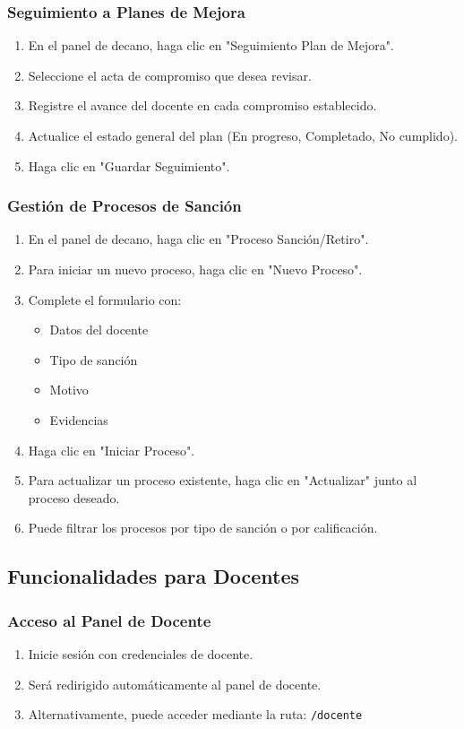 \documentclass[12pt,a4paper]{article}
\begin{document}
\subsubsection{Seguimiento a Planes de Mejora}
\begin{enumerate}
    \item En el panel de decano, haga clic en "Seguimiento Plan de Mejora".
    \item Seleccione el acta de compromiso que desea revisar.
    \item Registre el avance del docente en cada compromiso establecido.
    \item Actualice el estado general del plan (En progreso, Completado, No cumplido).
    \item Haga clic en "Guardar Seguimiento".
\end{enumerate}

\subsubsection{Gestión de Procesos de Sanción}
\begin{enumerate}
    \item En el panel de decano, haga clic en "Proceso Sanción/Retiro".
    \item Para iniciar un nuevo proceso, haga clic en "Nuevo Proceso".
    \item Complete el formulario con:
    \begin{itemize}
        \item Datos del docente
        \item Tipo de sanción
        \item Motivo
        \item Evidencias
    \end{itemize}
    \item Haga clic en "Iniciar Proceso".
    \item Para actualizar un proceso existente, haga clic en "Actualizar" junto al proceso deseado.
    \item Puede filtrar los procesos por tipo de sanción o por calificación.
\end{enumerate}

\subsection{Funcionalidades para Docentes}
\subsubsection{Acceso al Panel de Docente}
\begin{enumerate}
    \item Inicie sesión con credenciales de docente.
    \item Será redirigido automáticamente al panel de docente.
    \item Alternativamente, puede acceder mediante la ruta: \texttt{/docente}
\end{enumerate}
\end{document}

